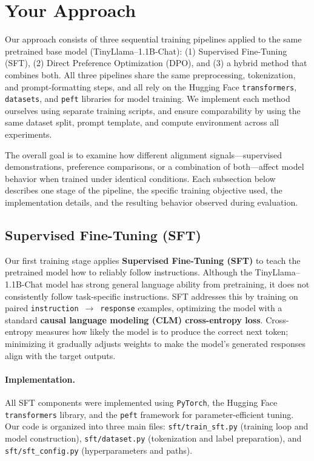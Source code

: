 \documentclass[11pt,a4paper]{article}
\begin{document}
\section{Your Approach}

Our approach consists of three sequential training pipelines applied to the same pretrained base model (TinyLlama--1.1B-Chat): (1) Supervised Fine-Tuning (SFT), (2) Direct Preference Optimization (DPO), and (3) a hybrid method that combines both. All three pipelines share the same preprocessing, tokenization, and prompt-formatting steps, and all rely on the Hugging Face \texttt{transformers}, \texttt{datasets}, and \texttt{peft} libraries for model training. We implement each method ourselves using separate training scripts, and ensure comparability by using the same dataset split, prompt template, and compute environment across all experiments. 

The overall goal is to examine how different alignment signals—supervised demonstrations, preference comparisons, or a combination of both—affect model behavior when trained under identical conditions. Each subsection below describes one stage of the pipeline, the specific training objective used, the implementation details, and the resulting behavior observed during evaluation.

\subsection{Supervised Fine-Tuning (SFT)}

Our first training stage applies \textbf{Supervised Fine-Tuning (SFT)} to teach the pretrained model how to reliably follow instructions. Although the TinyLlama--1.1B-Chat model has strong general language ability from pretraining, it does not consistently follow task-specific instructions. SFT addresses this by training on paired \texttt{instruction}~$\rightarrow$~\texttt{response} examples, optimizing the model with a standard \textbf{causal language modeling (CLM) cross-entropy loss}. Cross-entropy measures how likely the model is to produce the correct next token; minimizing it gradually adjusts weights to make the model’s generated responses align with the target outputs.

\paragraph{Implementation.}
All SFT components were implemented using \texttt{PyTorch}, the Hugging Face \texttt{transformers} library, and the \texttt{peft} framework for parameter-efficient tuning. Our code is organized into three main files: \texttt{sft/train\_sft.py} (training loop and model construction), \texttt{sft/dataset.py} (tokenization and label preparation), and \texttt{sft/sft\_config.py} (hyperparameters and paths).
\end{document}
